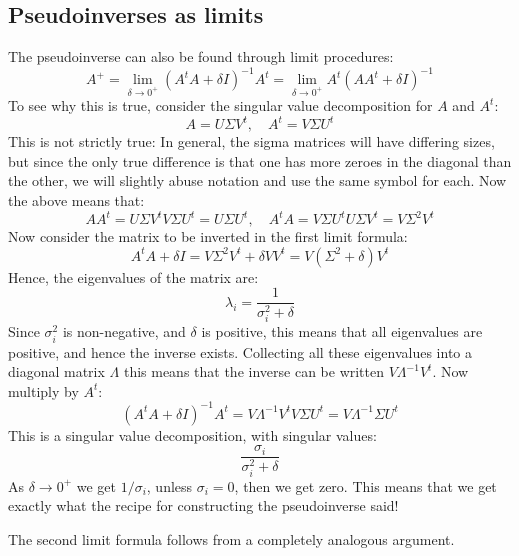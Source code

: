 \documentclass[12pt, a4paper]{article}
\numberwithin{equation}{section}
\begin{document}
\subsection{Pseudoinverses as limits}
The pseudoinverse can also be found through limit procedures:
\begin{equation}
A^+=\lim_{\delta\rightarrow 0^+}(A^t A+\delta I)^{-1}A^t=\lim_{\delta\rightarrow 0^+}A^t(AA^t+\delta I)^{-1}
\end{equation}
To see why this is true, consider the singular value decomposition for $A$ and $A^t$:
\begin{equation}
A=U\Sigma V^t,\quad A^t=V\Sigma U^t
\end{equation}
This is not strictly true: In general, the sigma matrices will have differing sizes, but since the only true difference is that one has more zeroes in the diagonal than the other, we will slightly abuse notation and use the same symbol for each. Now the above means that:
\begin{equation}
AA^t=U\Sigma V^t V\Sigma U^t=U\Sigma U^t,\quad
A^t A=V\Sigma U^t U\Sigma V^t=V\Sigma^2 V^t
\end{equation}
Now consider the matrix to be inverted in the first limit formula:
\begin{equation}
A^t A+\delta I=V\Sigma^2 V^t+\delta VV^t=V(\Sigma^2+\delta)V^t
\end{equation}
Hence, the eigenvalues of the matrix are:
\begin{equation}
\lambda_i=\frac{1}{\sigma_i^2+\delta}
\end{equation}
Since $\sigma_i^2$ is non-negative, and $\delta$ is positive, this means that all eigenvalues are positive, and hence the inverse exists. Collecting all these eigenvalues into a diagonal matrix $\Lambda$ this means that the inverse can be written $V\Lambda^{-1}V^t$. Now multiply by $A^t$:
\begin{equation}
(A^t A+\delta I)^{-1}A^t=V\Lambda^{-1}V^t V\Sigma U^t=V\Lambda^{-1}\Sigma U^t
\end{equation}
This is a singular value decomposition, with singular values:
\begin{equation}
\frac{\sigma_i}{\sigma_i^2+\delta}
\end{equation}
As $\delta\rightarrow 0^+$ we get $1/\sigma_i$, unless $\sigma_i=0$, then we get zero. This means that we get exactly what the recipe for constructing the pseudoinverse said!

The second limit formula follows from a completely analogous argument.
\end{document}
